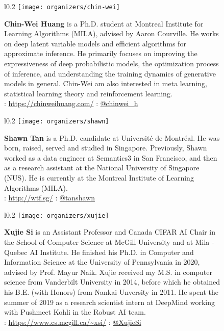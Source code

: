 \documentclass{article}
\begin{document}
    \begin{figure}[H]
        \begin{wrapfigure}{l}{0.2\textwidth}
            \texttt{[image: organizers/chin-wei]}
        \end{wrapfigure}
        \textbf{Chin-Wei Huang} is a Ph.D. student at Montreal Institute for Learning Algorithms (MILA), advised by Aaron Courville. He works on deep latent variable models and efficient algorithms for approximate inference. He primarily focuses on improving the expressiveness of deep probabilistic models, the optimization process of inference, and understanding the training dynamics of generative models in general. Chin-Wei am also interested in meta learning, statistical learning theory and reinforcement learning.\\
        \faHome: \url{https://chinweihuang.com/} \faTwitter: \href{https://twitter.com/chinwei_h}{@chinwei\_h}
    \end{figure}

    \begin{figure}[H]
        \begin{wrapfigure}{l}{0.2\textwidth}
            \texttt{[image: organizers/shawn]}
        \end{wrapfigure}
        \textbf{Shawn Tan} is a Ph.D. candidate at Universit\'e de Montr\'eal. He was born, raised, served and studied in Singapore. Previously, Shawn worked as a data engineer at Semantics3 in San Francisco, and then as a research assistant at the National University of Singapore (NUS). He is currently at the Montreal Institute of Learning Algorithms (MILA).\\
        \faHome: \url{http://wtf.sg/} \faTwitter: \href{https://twitter.com/tanshawn}{@tanshawn}
    \end{figure}

    \begin{figure}[H]
        \begin{wrapfigure}{l}{0.2\textwidth}
            \texttt{[image: organizers/xujie]}
        \end{wrapfigure}
        \textbf{Xujie Si} is an Assistant Professor and Canada CIFAR AI Chair in the School of Computer Science at McGill University and at Mila - Quebec AI Institute. He finished his Ph.D. in Computer and Information Science at the University of Pennsylvania in 2020, advised by Prof. Mayur Naik. Xujie received my M.S. in computer science from Vanderbilt University in 2014, before which he obtained his B.E. (with Honors) from Nankai Unversity in 2011. He spent the summer of 2019 as a research scientist intern at DeepMind working with Pushmeet Kohli in the Robust AI team.\\
        \faHome: \url{https://www.cs.mcgill.ca/~xsi/} \faTwitter: \href{https://twitter.com/xujiesi}{@XujieSi}
    \end{figure}
\end{document}
